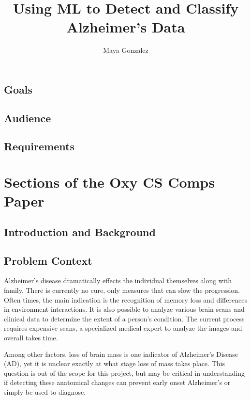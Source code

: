 \documentclass[10pt,twocolumn]{article}
\title{Using ML to Detect and Classify Alzheimer's Data}
\author{Maya Gonzalez}
\affiliation{Occidental College}
\begin{document}
\maketitle

\begin{abstract}
\end{abstract}

\subsection{Goals}

\subsection{Audience}

\subsection{Requirements}

\section{Sections of the Oxy CS Comps Paper}

\subsection{Introduction and Background}

\subsection{Problem Context}
Alzheimer's disease dramatically effects the individual themselves along with family. There is currently no cure, only measures that can slow the progression. Often times, the main indication is the recognition of memory loss and differences in environment interactions. It is also possible to analyze various brain scans and clinical data to determine the extent of a person's  condition. The current process requires expensive scans, a specialized medical expert to analyze the images and overall takes time. 


Among other factors, loss of brain mass is one indicator of Alzheimer's Disease (AD), yet it is unclear exactly at what stage loss of mass takes place. This question is out of the scope for this project, but may be critical in understanding if detecting these anatomical changes can prevent early onset Alzheimer's or simply be used to diagnose. 
\end{document}
